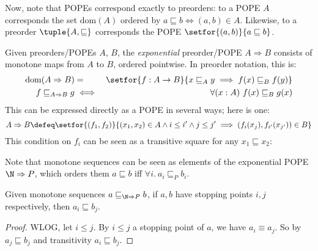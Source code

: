 \documentclass{article}
\newcommand{\ale}{\sqsubseteq}
\newcommand{\dom}[1]{\mathrm{dom}(#1)}
\newcommand{\expope}[2]{#1 \Rightarrow #2}
\newcommand{\ALER}{\arrow[no line]{r}{\rotatebox[origin=c]{0}{\scalebox{1.33}{$\ale$}}}}
\newcommand{\ALED}{\arrow[no line]{d}{\rotatebox[origin=c]{-90}{\scalebox{1.33}{$\ale$}}}}
\begin{document}
Now, note that POPEs correspond exactly to preorders: to a POPE $A$ corresponds
the set $\dom{A}$ ordered by $a \ale b \iff (a,b) \in A$. Likewise, to a
preorder $\tuple{A,\ale}$ corresponds the POPE $\setfor{(a,b)}{a \ale b}$.

\begin{definition}
  Given preorders/POPEs $A$, $B$, the \emph{exponential} preorder/POPE
  $\expope{A}{B}$ consists of monotone maps from $A$ to $B$, ordered pointwise.
  In preorder notation, this is:
  \begin{eqnarray*}
    \dom{\expope{A}{B}} &=& \setfor{f : A \to B}
        {x \ale_A y \implies f(x) \ale_B f(y)}\\
    f \ale_{\expope{A}{B}} g &\iff& \forall(x : A)\ f(x) \ale_B g(x)
  \end{eqnarray*}
  This can be expressed directly as a POPE in several ways; here is one:
  \begin{equation*}
    \expope{A}{B} \defeq
    \setfor{(f_1,f_2)}
           {(x_1, x_2) \in A \wedge i \le i' \wedge j \le j'
             \implies (f_i(x_j), f_{i'}(x_{j'})) \in B}
  \end{equation*}
  This condition on $f_i$ can be seen as a transitive square for any $x_1 \ale
  x_2$:
  \begin{center}
            {}
  \end{center}
\end{definition}

Note that monotone sequences can be seen as elements of the exponential POPE
$\expope{\N}{P}$, which orders them $a \ale b$ iff $\forall i.\ a_i \ale_P b_i$.

\begin{theorem}\label{thm:stopping-points-le}
  Given monotone sequences $a \ale_{\expope{\N}{P}} b$, if $a,b$ have stopping
  points $i,j$ respectively, then $a_i \ale b_j$.
\end{theorem}
\begin{proof}
  WLOG, let $i \le j$. By $i \le j$ a stopping point of $a$, we have
  $a_i \equiv a_j$. So by $a_j \ale b_j$ and transitivity $a_i \ale b_j$.
\end{proof}
\end{document}
